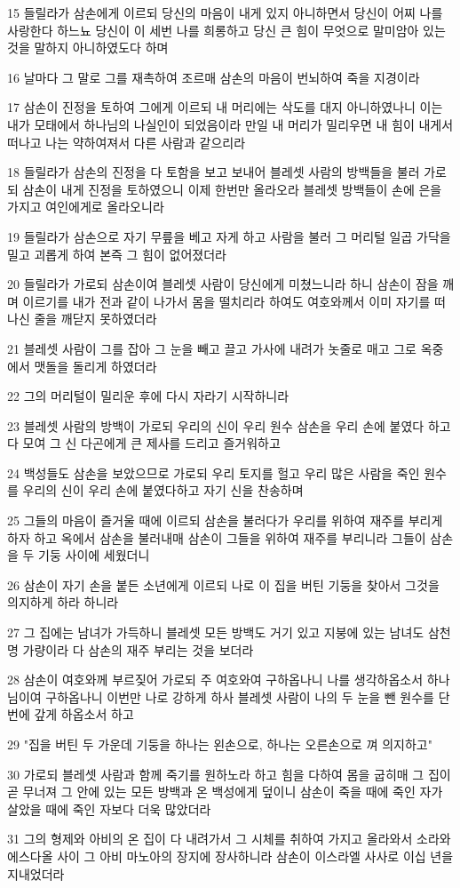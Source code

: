 \par 15 들릴라가 삼손에게 이르되 당신의 마음이 내게 있지 아니하면서 당신이 어찌 나를 사랑한다 하느뇨 당신이 이 세번 나를 희롱하고 당신 큰 힘이 무엇으로 말미암아 있는 것을 말하지 아니하였도다 하며
\par 16 날마다 그 말로 그를 재촉하여 조르매 삼손의 마음이 번뇌하여 죽을 지경이라
\par 17 삼손이 진정을 토하여 그에게 이르되 내 머리에는 삭도를 대지 아니하였나니 이는 내가 모태에서 하나님의 나실인이 되었음이라 만일 내 머리가 밀리우면 내 힘이 내게서 떠나고 나는 약하여져서 다른 사람과 같으리라
\par 18 들릴라가 삼손의 진정을 다 토함을 보고 보내어 블레셋 사람의 방백들을 불러 가로되 삼손이 내게 진정을 토하였으니 이제 한번만 올라오라 블레셋 방백들이 손에 은을 가지고 여인에게로 올라오니라
\par 19 들릴라가 삼손으로 자기 무릎을 베고 자게 하고 사람을 불러 그 머리털 일곱 가닥을 밀고 괴롭게 하여 본즉 그 힘이 없어졌더라
\par 20 들릴라가 가로되 삼손이여 블레셋 사람이 당신에게 미쳤느니라 하니 삼손이 잠을 깨며 이르기를 내가 전과 같이 나가서 몸을 떨치리라 하여도 여호와께서 이미 자기를 떠나신 줄을 깨닫지 못하였더라
\par 21 블레셋 사람이 그를 잡아 그 눈을 빼고 끌고 가사에 내려가 놋줄로 매고 그로 옥중에서 맷돌을 돌리게 하였더라
\par 22 그의 머리털이 밀리운 후에 다시 자라기 시작하니라
\par 23 블레셋 사람의 방백이 가로되 우리의 신이 우리 원수 삼손을 우리 손에 붙였다 하고 다 모여 그 신 다곤에게 큰 제사를 드리고 즐거워하고
\par 24 백성들도 삼손을 보았으므로 가로되 우리 토지를 헐고 우리 많은 사람을 죽인 원수를 우리의 신이 우리 손에 붙였다하고 자기 신을 찬송하며
\par 25 그들의 마음이 즐거울 때에 이르되 삼손을 불러다가 우리를 위하여 재주를 부리게 하자 하고 옥에서 삼손을 불러내매 삼손이 그들을 위하여 재주를 부리니라 그들이 삼손을 두 기둥 사이에 세웠더니
\par 26 삼손이 자기 손을 붙든 소년에게 이르되 나로 이 집을 버틴 기둥을 찾아서 그것을 의지하게 하라 하니라
\par 27 그 집에는 남녀가 가득하니 블레셋 모든 방백도 거기 있고 지붕에 있는 남녀도 삼천명 가량이라 다 삼손의 재주 부리는 것을 보더라
\par 28 삼손이 여호와께 부르짖어 가로되 주 여호와여 구하옵나니 나를 생각하옵소서 하나님이여 구하옵나니 이번만 나로 강하게 하사 블레셋 사람이 나의 두 눈을 뺀 원수를 단번에 갚게 하옵소서 하고
\par 29 "집을 버틴 두 가운데 기둥을 하나는 왼손으로, 하나는 오른손으로 껴 의지하고"
\par 30 가로되 블레셋 사람과 함께 죽기를 원하노라 하고 힘을 다하여 몸을 굽히매 그 집이 곧 무너져 그 안에 있는 모든 방백과 온 백성에게 덮이니 삼손이 죽을 때에 죽인 자가 살았을 때에 죽인 자보다 더욱 많았더라
\par 31 그의 형제와 아비의 온 집이 다 내려가서 그 시체를 취하여 가지고 올라와서 소라와 에스다올 사이 그 아비 마노아의 장지에 장사하니라 삼손이 이스라엘 사사로 이십 년을 지내었더라

